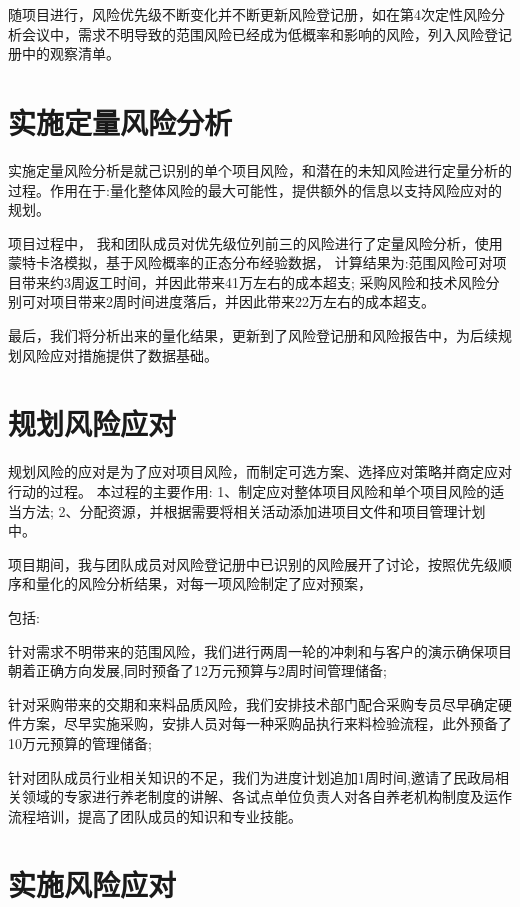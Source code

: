 \documentclass[UTF8]{../computerUniverse}
\begin{document}
随项目进行，风险优先级不断变化并不断更新风险登记册，如在第4次定性风险分析会议中，需求不明导致的范围风险已经成为低概率和影响的风险，列入风险登记册中的观察清单。

\section{实施定量风险分析}

实施定量风险分析是就己识别的单个项目风险，和潜在的未知风险进行定量分析的过程。作用在于:量化整体风险的最大可能性，提供额外的信息以支持风险应对的规划。

项目过程中，
我和团队成员对优先级位列前三的风险进行了定量风险分析，使用蒙特卡洛模拟，基于风险概率的正态分布经验数据，
计算结果为:范围风险可对项目带来约3周返工时间，并因此带来41万左右的成本超支;
采购风险和技术风险分别可对项目带来2周时间进度落后，并因此带来22万左右的成本超支。

最后，我们将分析出来的量化结果，更新到了风险登记册和风险报告中，为后续规划风险应对措施提供了数据基础。



\section{规划风险应对}

规划风险的应对是为了应对项目风险，而制定可选方案、选择应对策略并商定应对行动的过程。
本过程的主要作用:
1、制定应对整体项目风险和单个项目风险的适当方法;
2、分配资源，并根据需要将相关活动添加进项目文件和项目管理计划中。


项目期间，我与团队成员对风险登记册中已识别的风险展开了讨论，按照优先级顺序和量化的风险分析结果，对每一项风险制定了应对预案，

包括:

针对需求不明带来的范围风险，我们进行两周一轮的冲刺和与客户的演示确保项目朝着正确方向发展,同时预备了12万元预算与2周时间管理储备;

针对采购带来的交期和来料品质风险，我们安排技术部门配合采购专员尽早确定硬件方案，尽早实施采购，安排人员对每一种采购品执行来料检验流程，此外预备了10万元预算的管理储备;

针对团队成员行业相关知识的不足，我们为进度计划追加1周时间,邀请了民政局相关领域的专家进行养老制度的讲解、各试点单位负责人对各自养老机构制度及运作流程培训，提高了团队成员的知识和专业技能。


\section{实施风险应对}
\end{document}

